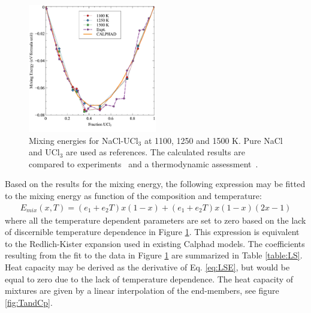 \documentclass[preprint,3p,10pt,onecolumn,number,sort&compress]{elsarticle}
\begin{document}
{\begin{figure}[htb]
\centering
\includegraphics[width=0.5\textwidth]{fig10.jpg}
\caption{Mixing energies for NaCl-UCl$_3$ at 1100, 1250 and 1500 K. Pure NaCl and UCl$_3$ are used as references. The calculated results are compared to experiments~\cite{Matsuura} and a thermodynamic assessment~\cite{YIN2020}.%
} 
\label{fig:mixing}
\end{figure}

Based on the results for the mixing energy, the following expression may be fitted to the mixing energy as function of the composition and temperature:
\begin{equation}
\begin{split}
E_{mix}(x,T)=(e_1+e_2T)x(1-x)+(e_1+e_2T)x(1-x)(2x-1) %
\label{eq:LSE}
\end{split}
\end{equation}
where all the temperature dependent parameters are set to zero based on the lack of discernible temperature dependence in Figure \ref{fig:mixing}. This expression is equivalent to the Redlich-Kister expansion used in existing Calphad models. The coefficients resulting from the fit to the data in Figure \ref{fig:mixing} are summarized in Table \ref{table:LS}. Heat capacity may be derived as the derivative of Eq. \ref{eq:LSE}, but would be equal to zero due to the lack of temperature dependence. The heat capacity of mixtures are given by a linear interpolation of the end-members, see figure \ref{fig:TandCp}.

}
\end{document}
